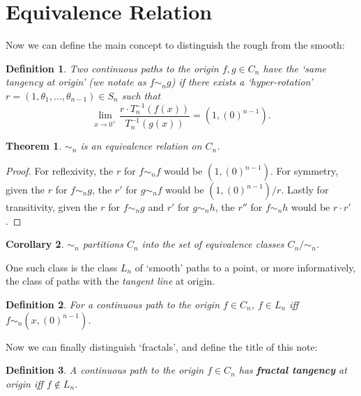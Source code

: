 \documentclass{article}
\theoremstyle{plain}
\newtheorem{definition}{Definition}[section]
\newtheorem{theorem}{Theorem}[section]
\newtheorem{corollary}[theorem]{Corollary}
\begin{document}
\section{Equivalence Relation}
Now we can define the main concept to distinguish the rough from the smooth:
\begin{definition}\label{equiv}
Two continuous paths to the origin $f, g \in C_n$ have the `same tangency at origin' (we notate as $f \sim_n g$) if there exists a `hyper-rotation' $r = (1, \theta_1, \ldots, \theta_{n-1}) \in S_n$ such that $$\lim_{x\rightarrow 0^{+}} \frac{r \cdot T_n^{-1}(f(x))}{T_n^{-1}(g(x))} = (1, (0)^{n-1}).$$
\end{definition}
\begin{theorem}
$\sim_n$ is an equivalence relation on $C_n$.
\end{theorem}
\begin{proof}
For reflexivity, the $r$ for $f \sim_n f$ would be $(1, (0)^{n-1})$. For symmetry, given the $r$ for $f \sim_n g$, the $r'$ for $g \sim_n f$ would be $(1, (0)^{n-1})/r$. Lastly for transitivity, given the $r$ for $f \sim_n g$ and $r'$ for $g \sim_n h$, the $r''$ for $f \sim_n h$ would be $r \cdot r'$.
\end{proof}
\begin{corollary}
$\sim_n$ partitions $C_n$ into the set of equivalence classes $C_n / \sim_n$.
\end{corollary}
One such class is the class $L_n$ of `smooth' paths to a point, or more informatively, the class of paths with the \textit{tangent line} at origin.
\begin{definition}
For a continuous path to the origin $f \in C_n$, $f \in L_n$ iff $f \sim_n (x, (0)^{n-1})$.
\end{definition}
Now we can finally distinguish `fractals', and define the title of this note:
\begin{definition}
A continuous path to the origin $f \in C_n$  has \textbf{fractal tangency} at origin iff $f \not\in L_n$.
\end{definition}
\end{document}
